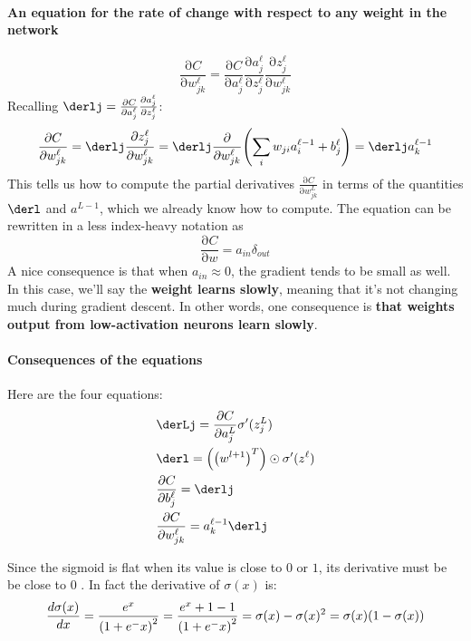 \documentclass[12pt, letterpaper]{article}
\theoremstyle{definition}
\DeclarePairedDelimiter\autobracket{(}{)}
\newcommand{\br}[1]{\autobracket*{#1}}
\newcommand{\pr}{\mathrm{\partial}}
\let\tb\textbf
\begin{document}
\paragraph{\tb{An equation for the rate of change with respect to any weight in the network}}
\begin{equation}
\frac{\pr C}{\pr w_{jk}^\ell} = \frac{\pr C}{\pr a_j^\ell} \frac{\pr a_j^\ell}{\pr z_j^\ell} \frac{\pr z_j^\ell}{\pr w_{jk}^\ell} 
\end{equation}
Recalling $\derlj= \frac{\pr C}{\pr a_j^\ell} \frac{\pr a_j^\ell}{\pr z_j^\ell}$:
\begin{equation}
\frac{\pr C}{\pr w_{jk}^\ell} = \derlj \frac{\pr z_j^\ell}{\pr w_{jk}^\ell} =  \derlj \frac{\pr }{\pr w_{jk}^\ell} \br{\sum_i w_{ji}a_i^{\ell-1}+b_j^\ell} =  \derlj a_k^{\ell-1}
\end{equation}
This tells us how to compute the partial derivatives $\frac{\pr C}{\pr w_{jk}^L} $ in terms of the quantities $\derl$ and $a^{L-1}$, which we already know how to compute. The equation can be rewritten in a less index-heavy notation as
\begin{equation}
\frac{\pr C}{\pr w}  = a_{in} \delta_{out}
\end{equation}
A nice consequence is that when $a_{in} \approx 0$, the gradient tends to be small as well. In this case, we'll say the \tb{weight learns slowly}, meaning that it's not changing much during gradient descent. In other words, one consequence is \tb{that weights output from low-activation neurons learn slowly}.

\paragraph{\tb{Consequences of the equations}}Here are the four equations:
\begin{equation}
\begin{aligned}
&\derLj = \frac{\pr C}{\pr a_j^L} \sigma'(z_j^L)\\
&\derl = \br{\br{w^{l+1}}^T}\odot \sigma'(z^\ell)\\
&\frac{\pr C}{\pr b_{j}^\ell}  = \derlj\\
&\frac{\pr C}{\pr w_{jk}^\ell}= a_k^{\ell-1}\derlj\\
\end{aligned}
\end{equation}

Since the sigmoid is flat when its value is close to $0$ or $1$, its derivative must be be close to $0$ . In fact the derivative of $\sigma(x)$ is:
\begin{equation}
\frac{d \sigma(x)}{d x} = \frac{e^x}{\br{1+e^-x}^2} = \frac{e^x+1-1}{\br{1+e^-x}^2} =\sigma(x) - \sigma(x)^2 = \sigma(x) \br{1-\sigma(x)}
\end{equation}
\end{document}
